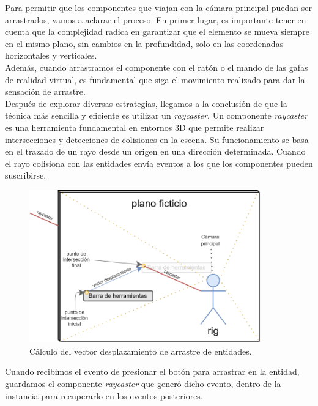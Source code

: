 \documentclass[a4paper, 11pt]{book}
\begin{document}
Para permitir que los componentes que viajan con la cámara principal puedan ser arrastrados, vamos a aclarar el proceso. En primer lugar, es importante tener en cuenta que la complejidad radica en garantizar que el elemento se mueva siempre en el mismo plano, sin cambios en la profundidad, solo en las coordenadas horizontales y verticales.\\
Además, cuando arrastramos el componente con el ratón o el mando de las gafas de realidad virtual, es fundamental que siga el movimiento realizado para dar la sensación de arrastre.\\
Después de explorar diversas estrategias, llegamos a la conclusión de que la técnica más sencilla y eficiente es utilizar un \emph{raycaster}. Un componente \emph{raycaster} es una herramienta fundamental en entornos \textsc{3D} que permite realizar intersecciones y detecciones de colisiones en la escena. Su funcionamiento se basa en el trazado de un rayo desde un origen en una dirección determinada. Cuando el rayo colisiona con las entidades envía eventos a los que los componentes pueden suscribirse.\\
\begin{figure}[h]
	\centering
	\includegraphics[width=10cm, keepaspectratio]{img/custom-draggable.png}
	\caption{Cálculo del vector desplazamiento de arrastre de entidades.}
	\label{fig:raycaster}
\end{figure}
Cuando recibimos el evento de presionar el botón para arrastrar en la entidad, guardamos el componente \emph{raycaster} que generó dicho evento, dentro de la instancia para recuperarlo en los eventos posteriores. 
\end{document}
